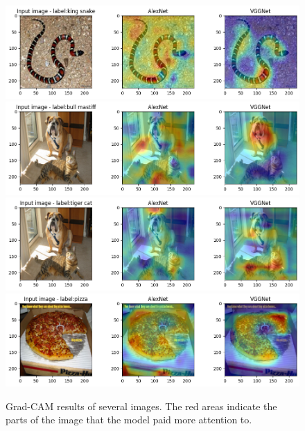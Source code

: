 \documentclass[extendedabs]{bmvc2k}
\begin{document}
\begin{figure}[t]
\centering
	\includegraphics[width=\linewidth]{images/gradcamresult1.png}
    \includegraphics[width=\linewidth]{images/gradcamresult2.png}
    \includegraphics[width=\linewidth]{images/gradcamresult3.png}
    \includegraphics[width=\linewidth]{images/gradcamresult4.png}
    
	\caption{
		Grad-CAM results of several images. The red areas indicate the parts of the image that the model paid more attention to. }
	\vspace{-2mm}
        \label{fig:gradcamresult}
\end{figure}

\newpage

\end{document}
